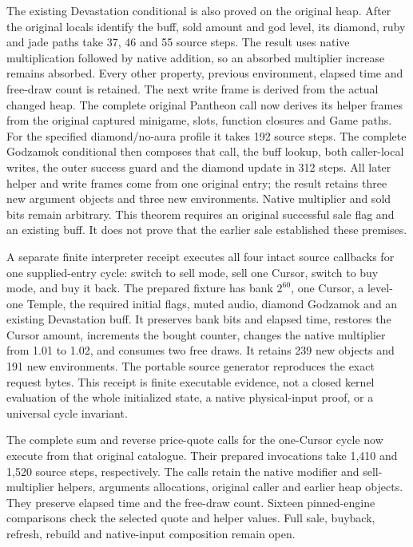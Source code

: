 \documentclass[11pt,a4paper]{article}
\numberwithin{equation}{section}
\theoremstyle{definition}
\theoremstyle{remark}
\begin{document}
The existing Devastation conditional is also proved on the original heap. After the original locals identify the buff, sold amount and god level, its diamond, ruby and jade paths take 37, 46 and 55 source steps. The result uses native multiplication followed by native addition, so an absorbed multiplier increase remains absorbed. Every other property, previous environment, elapsed time and free-draw count is retained. The next write frame is derived from the actual changed heap. The complete original Pantheon call now derives its helper frames from the original captured minigame, slots, function closures and Game paths. For the specified diamond/no-aura profile it takes 192 source steps. The complete Godzamok conditional then composes that call, the buff lookup, both caller-local writes, the outer success guard and the diamond update in 312 steps. All later helper and write frames come from one original entry; the result retains three new argument objects and three new environments. Native multiplier and sold bits remain arbitrary. This theorem requires an original successful sale flag and an existing buff. It does not prove that the earlier sale established these premises.

A separate finite interpreter receipt executes all four intact source callbacks for one supplied-entry cycle: switch to sell mode, sell one Cursor, switch to buy mode, and buy it back. The prepared fixture has bank $2^{60}$, one Cursor, a level-one Temple, the required initial flags, muted audio, diamond Godzamok and an existing Devastation buff. It preserves bank bits and elapsed time, restores the Cursor amount, increments the bought counter, changes the native multiplier from 1.01 to 1.02, and consumes two free draws. It retains 239 new objects and 191 new environments. The portable source generator reproduces the exact request bytes. This receipt is finite executable evidence, not a closed kernel evaluation of the whole initialized state, a native physical-input proof, or a universal cycle invariant.

The complete sum and reverse price-quote calls for the one-Cursor cycle now execute from that original catalogue. Their prepared invocations take 1,410 and 1,520 source steps, respectively. The calls retain the native modifier and sell-multiplier helpers, arguments allocations, original caller and earlier heap objects. They preserve elapsed time and the free-draw count. Sixteen pinned-engine comparisons check the selected quote and helper values. Full sale, buyback, refresh, rebuild and native-input composition remain open.
\end{document}
